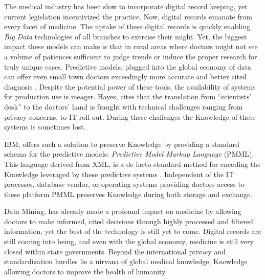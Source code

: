 \documentclass[12pt,letterpaper]{article}
\begin{document}
The 
medical industry has been slow to incorporate digital record keeping, yet
current legislation incentivized  the practice. Now, digital records emanate from
every facet of medicine. The uptake of these digital records is quickly enabling
\emph{Big Data} technologies of all branches to exercise their might. Yet, the
biggest impact these models can make is that in rural areas where doctors might
not see a volume of patiences sufficient to judge trends or induce the proper
research for truly unique cases. Predictive models, plugged into the global
economy of data can offer even small town doctors exceedingly more accurate and
better cited diagnosis \autocite{Guazzelli2011}. Despite the potential power of
these tools, the availability of systems for production use is meager. Hayes,
cites that the translation from ``scientists' desk'' to the doctors' hand is
fraught with technical challenges ranging from privacy concerns, to IT roll out.
During these challenges the Knowledge of these systems is sometimes lost. 

IBM, offers such a solution to preserve Knowledge by providing a standard
schema for the predictive models: \emph{Predictive Model Markup Language}
(PMML). This language derived from XML, is a de facto standard method for
encoding the Knowledge leveraged by these predictive systems
\autocite{WikiPredictiveLanguage}. Independent of
the IT processes, database vendor, or operating systems providing doctors access
to these platform PMML preserves Knowledge during both storage and exchange. 

Data Mining, has already made a profound impact on medicine by allowing doctors
to make informed, cited decisions through highly processed and filtered information,
yet the best of the technology is still yet to come. Digital records
are still coming into being, and even with the global economy, medicine is still
very closed within state governments. Beyond the international privacy and standardization
hurdles lie a nirvana of global medical knowledge, Knowledge allowing doctors to improve
the health of humanity. 



\printbibliography
\end{document}
